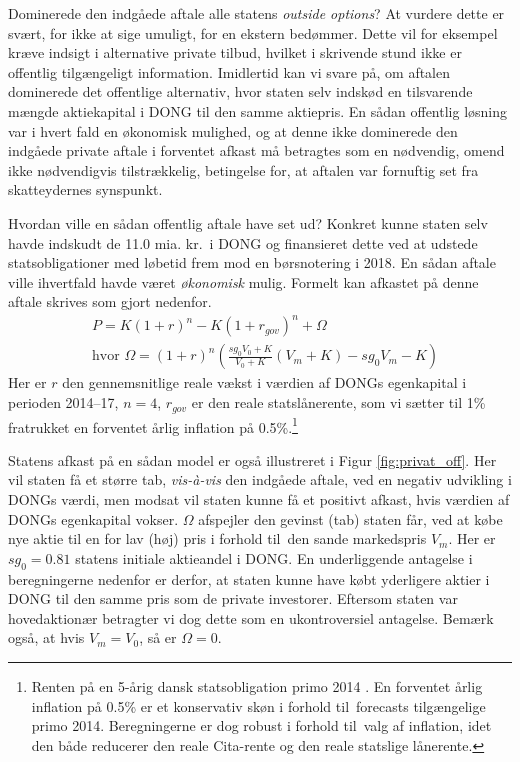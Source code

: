 \documentclass{article}
\begin{document}
Dominerede den indgåede aftale alle statens \emph{outside options}? At vurdere dette er svært, for ikke at sige umuligt, for en ekstern bedømmer. Dette vil for eksempel kræve indsigt i alternative private tilbud, hvilket i skrivende stund ikke er offentlig tilgængeligt information.
Imidlertid kan vi svare på, om aftalen dominerede det offentlige alternativ, hvor staten selv indskød en tilsvarende mængde aktiekapital i DONG til den samme aktiepris. En sådan offentlig løsning var i hvert fald en økonomisk mulighed, og at denne ikke dominerede den indgåede private aftale i forventet afkast må betragtes som en nødvendig, omend ikke nødvendigvis tilstrækkelig, betingelse for, at aftalen var fornuftig set fra skatteydernes synspunkt. 

Hvordan ville en sådan offentlig aftale have set ud? Konkret kunne staten selv havde indskudt de 11.0 mia. kr.\ i DONG og finansieret dette ved at udstede statsobligationer med løbetid frem mod en børsnotering i 2018. En sådan aftale ville ihvertfald havde været \emph{økonomisk} mulig. Formelt kan afkastet på denne aftale skrives som gjort nedenfor. 
\begin{align}
&P=K(1+r)^n-K(1+r_{gov})^n +\Omega \\
&\text{hvor } \Omega=(1+r)^n\left( \frac{sg_0 V_0+K}{V_0+K} \left( V_m+K \right)-sg_0 V_m -K\right)\nonumber
\label{eq:gov_capital}
\end{align}
Her er $r$ den gennemsnitlige reale vækst i værdien af DONGs egenkapital i perioden 2014--17, $n=4$, $r_{\mathit{gov}}$ er den reale statslånerente, som vi sætter til 1\% fratrukket en forventet årlig inflation på 0.5\%.\footnote{Renten på en 5-årig dansk statsobligation primo 2014 \citep{NB2014}. En forventet årlig inflation på 0.5\% er et konservativ skøn i forhold til\ forecasts tilgængelige primo 2014. Beregningerne er dog robust i forhold til\ valg af inflation, idet den både reducerer den reale Cita-rente og den reale statslige lånerente.}

Statens afkast på en sådan model er også illustreret i Figur \ref{fig:privat_off}. Her vil staten få et større tab, \emph{vis-\`{a}-vis} den indgåede aftale, ved en negativ udvikling i DONGs værdi, men modsat vil staten kunne få et positivt afkast, hvis værdien af DONGs egenkapital vokser. $\Omega$ afspejler den gevinst (tab) staten får, ved at købe nye aktie til en for lav (høj) pris i forhold til\ den sande markedspris $V_m$. Her er $sg_0=0.81$ statens initiale aktieandel i DONG. En underliggende antagelse i beregningerne nedenfor er derfor, at staten kunne have købt yderligere aktier i DONG til den samme pris som de private investorer. Eftersom staten var hovedaktionær betragter vi dog dette som en ukontroversiel antagelse. Bemærk også, at hvis $V_m=V_0$, så er $\Omega=0$.
\end{document}
